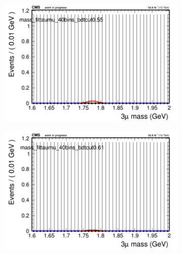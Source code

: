 \begin{figure}[H]
\begin{subfigure}{0.2\textwidth}
        \caption{}
    \end{subfigure}
    \begin{subfigure}{0.2\textwidth}
        \includegraphics[width=\textwidth]{power_law/plots/taumu/massfit_taumu_40bins_bdtcut0.55.png}
        \caption{}
    \end{subfigure}
    \begin{subfigure}{0.2\textwidth}
        \includegraphics[width=\textwidth]{power_law/plots/taumu/massfit_taumu_40bins_bdtcut0.61.png}
        \caption{}
    \end{subfigure}
    \begin{subfigure}{0.2\textwidth}

\end{subfigure}
\end{figure}
